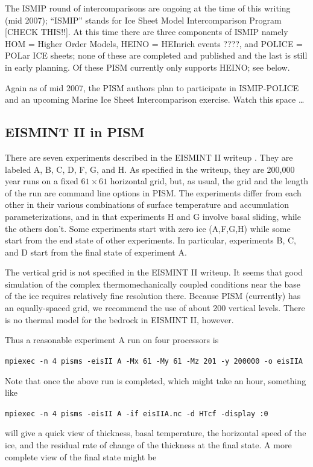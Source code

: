 \documentclass[12pt,final]{amsart}
\begin{document}
The ISMIP round of intercomparisons are ongoing at the time of this writing (mid 2007); ``ISMIP'' stands for Ice Sheet Model Intercomparison Program [CHECK THIS!!].  At this time there are three components of ISMIP namely HOM = Higher Order Models, HEINO = HEInrich events ????, and POLICE = POLar ICE sheets; none of these are completed and published and the last is still in early planning.  Of these PISM currently only supports HEINO; see below.

Again as of mid 2007, the PISM authors plan to participate in ISMIP-POLICE and an upcoming Marine Ice Sheet Intercomparison exercise.  Watch this space \dots

\subsection{EISMINT II in PISM}  There are seven experiments described in the EISMINT II writeup \cite{EISMINT00}. They are labeled A, B, C, D, F, G, and H.  As specified in the writeup, they are 200,000 year runs on a fixed $61\times 61$ horizontal grid, but, as usual, the grid and the length of the run are command line options in PISM.  The experiments differ from each other in their various combinations of surface temperature and accumulation parameterizations, and in that experiments H and G involve basal sliding, while the others don't.  Some experiments start with zero ice (A,F,G,H) while some start from the end state of other experiments.  In particular, experiments B, C, and D start from the final state of experiment A.

The vertical grid is not specified in the EISMINT II writeup.  It seems that good simulation of the complex thermomechanically coupled conditions near the base of the ice requires relatively fine resolution there.  Because PISM (currently) has an equally-spaced grid, we recommend the use of about 200 vertical levels.  There is no thermal model for the bedrock in EISMINT II, however.

Thus a reasonable experiment A run on four processors is

\verb|mpiexec -n 4 pisms -eisII A -Mx 61 -My 61 -Mz 201 -y 200000 -o eisIIA|

\noindent Note that once the above run is completed, which might take an hour, something like

\verb|mpiexec -n 4 pisms -eisII A -if eisIIA.nc -d HTcf -display :0|

\noindent will give a quick view of thickness, basal temperature, the horizontal speed of the ice, and the residual rate of change of the thickness at the final state.  A more complete view of the final state might be 
\end{document}
